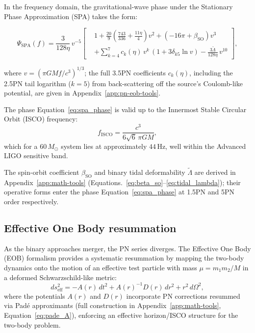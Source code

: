 \documentclass[11pt,a4paper, english]{book}
\theoremstyle{plain}
\theoremstyle{definition}
\numberwithin{equation}{chapter}
\numberwithin{figure}{chapter}
\numberwithin{table}{chapter}
\begin{document}
In the frequency domain, the gravitational-wave phase under the
Stationary Phase Approximation (SPA) takes the form:

\begin{equation}
  \label{eq:spa_phase}
  \Psi_\mathrm{SPA}(f) = \frac{3}{128\eta}\,v^{-5}
  \left[
  \begin{aligned}
    &1 + \frac{20}{9}\!\left(\frac{743}{336}+\frac{11\eta}{4}\right)v^2
      + \left(-16\pi + \beta_\mathrm{SO}\right)v^3 \\
    &+ \sum_{k=4}^{7} c_k(\eta)\,v^k\,(1+3\delta_{k5}\ln v)
      - \frac{3\tilde{\Lambda}}{128\eta}\,v^{10}
  \end{aligned}
  \right],
\end{equation}

where $v = (\pi G M f / c^3)^{1/3}$; the full 3.5PN coefficients
$c_k(\eta)$, including the 2.5PN tail logarithm ($k=5$) from
back-scattering off the source's Coulomb-like potential, are given in
Appendix~\ref{app:pn-eob-tools}.

The phase Equation~\eqref{eq:spa_phase} is valid up to the Innermost Stable Circular
Orbit (ISCO) frequency:
\begin{equation}
  \label{eq:isco}
  f_\mathrm{ISCO} = \frac{c^3}{6\sqrt{6}\,\pi G M},
\end{equation}
which for a $60\,M_\odot$ system lies at approximately $44$\,Hz,
well within the Advanced LIGO sensitive band.

The spin-orbit coefficient $\beta_\mathrm{SO}$ and binary tidal 
deformability $\tilde{\Lambda}$ are derived in 
Appendix~\ref{app:math-tools} 
(Equations.~\ref{eq:beta_so}--\ref{eq:tidal_lambda}); their operative 
forms enter the phase Equation~\eqref{eq:spa_phase} at 1.5PN and 5PN order 
respectively.

\subsection{Effective One Body resummation}
\label{subsec:eob}

As the binary approaches merger, the PN series diverges.  The Effective One
Body (EOB) formalism \cite{Buonanno_1999} provides a systematic resummation
by mapping the two-body dynamics onto the motion of an effective test particle
with mass $\mu = m_1 m_2/M$ in a deformed Schwarzschild-like metric:
\begin{equation}
  \label{eq:eob_metric}
  ds^2_\mathrm{eff} = -A(r)\,dt^2
    + A(r)^{-1}D(r)\,dr^2 + r^2\,d\Omega^2,
\end{equation}
where the potentials $A(r)$ and $D(r)$ incorporate PN corrections resummed
via Pad\'e approximants (full construction in 
Appendix~\ref{app:math-tools}, Equation~\ref{eq:pade_A}), 
enforcing an effective horizon/ISCO structure for the two-body problem.
\end{document}
